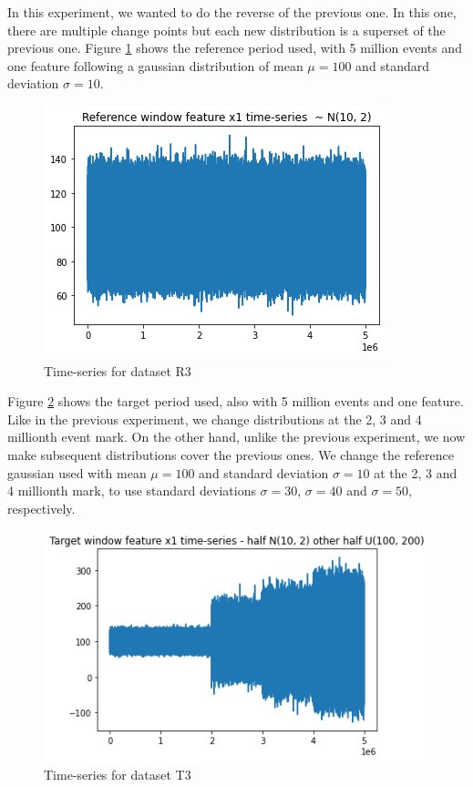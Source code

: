 In this experiment, we wanted to do the reverse of the previous one. In this one, there are multiple change points but each new distribution is a superset of the previous one. Figure \ref{fig:timeseries-r3} shows the reference period used, with 5 million events and one feature following a gaussian distribution of mean $\mu=100$ and standard deviation $\sigma=10$.
\begin{figure}[!htb]
    \begin{center}
      \includegraphics[scale=0.6]{figures/timeseries-r3.png}
      \caption[]{Time-series for dataset R3}
      \label{fig:timeseries-r3}
    \end{center}
\end{figure}
Figure \ref{fig:timeseries-t3} shows the target period used, also with 5 million events and one feature. Like in the previous experiment, we change distributions at the 2, 3 and 4 millionth event mark. On the other hand, unlike the previous experiment, we now make subsequent distributions cover the previous ones. We change the reference gaussian used with mean $\mu=100$ and standard deviation $\sigma=10$ at the 2, 3 and 4 millionth mark, to use standard deviations $\sigma=30$, $\sigma=40$ and $\sigma=50$, respectively.
\begin{figure}[!htb]
    \begin{center}
      \includegraphics[scale=0.6]{figures/timeseries-t3.png}
      \caption[]{Time-series for dataset T3}
      \label{fig:timeseries-t3}
    \end{center}
\end{figure}

